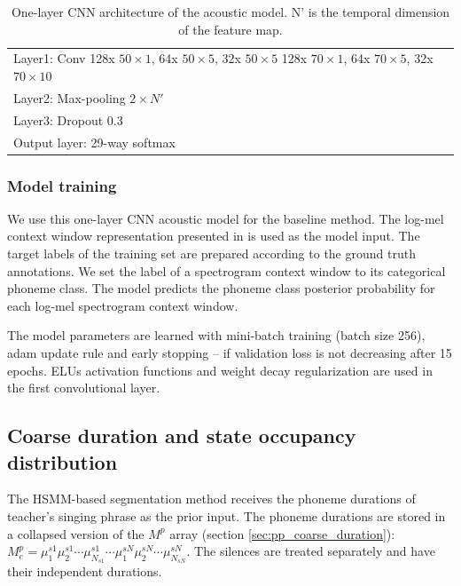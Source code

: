 \begin{table}[ht!]
\centering
\caption{One-layer \gls{CNN} architecture of the acoustic model. N' is the temporal dimension of the feature map.}
\label{table:ch5:cnn_acoustic_model}
\begin{tabular}{l}
\toprule
\makecell[l]{Layer1: Conv 128x $50{\times}1$, 64x $50{\times}5$, 32x $50{\times}5$\\128x $70{\times}1$, 64x $70{\times}5$, 32x $70{\times}10$} \\
Layer2: Max-pooling $2{\times}N'$ \\
Layer3: Dropout 0.3\\
Output layer: 29-way softmax\\
\bottomrule
\end{tabular}
\end{table}

\subsubsection{Model training}

We use this one-layer \gls{CNN} acoustic model for the baseline method. The log-mel context window representation presented in  is used as the model input. The target labels of the training set are prepared according to the ground truth annotations. We set the label of a spectrogram context window to its categorical phoneme class. The model predicts the phoneme class posterior probability for each log-mel spectrogram context window.

The model parameters are learned with mini-batch training (batch size 256), adam \cite{kingma2014adam} update rule and early stopping -- if validation loss is not decreasing after 15 epochs. \gls{ELU}s activation functions and weight decay regularization are used in the first convolutional layer.

\subsection{Coarse duration and state occupancy distribution}

The \gls{HSMM}-based segmentation method receives the phoneme durations of teacher's singing phrase as the prior input. The phoneme durations are stored in a collapsed version of the $M^p$ array (section \ref{sec:pp_coarse_duration}): $M_c^p=\mu_{1}^{s1} \mu_{2}^{s1} \cdots \mu_{N_{s1}}^{s1} \cdots \mu_{1}^{sN} \mu_{2}^{sN} \cdots \mu_{N_{sN}}^{sN}$. The silences are treated separately and have their independent durations.

